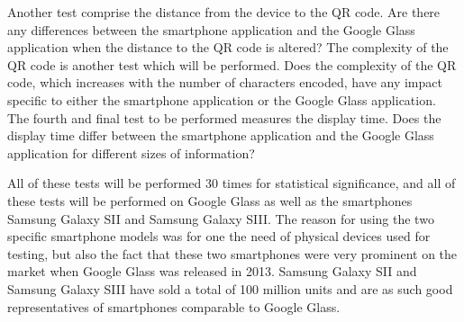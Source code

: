 Another test comprise the distance from the device to the QR code. Are there any differences between the smartphone application and the Google Glass application when the distance to the QR code is altered? The complexity of the QR code is another test which will be performed. Does the complexity of the QR code, which increases with the number of characters encoded, have any impact specific to either the smartphone application or the Google Glass application. The fourth and final test to be performed measures the display time. Does the display time differ between the smartphone application and the Google Glass application for different sizes of information?

All of these tests will be performed 30 times for statistical significance, and all of these tests will be performed on Google Glass as well as the smartphones Samsung Galaxy SII and Samsung Galaxy SIII. The reason for using the two specific smartphone models was for one the need of physical devices used for testing, but also the fact that these two smartphones were very prominent on the market when Google Glass was released in 2013. Samsung Galaxy SII and Samsung Galaxy SIII have sold a total of 100 million units and are as such good representatives of smartphones comparable to Google Glass.


